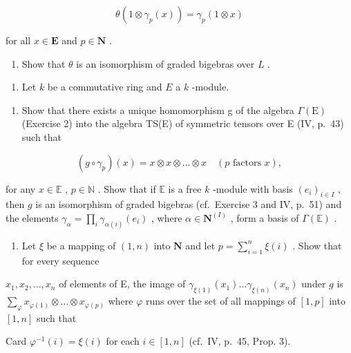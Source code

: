 \[
\theta (1 \otimes \gamma_ {p} (x)) = \gamma_ {p} (1 \otimes x)
\]

for all \(x \in \mathbf{E}\) and \(p \in \mathbf{N}\) .

\begin{enumerate}
\def\labelenumi{\alph{enumi})}
\setcounter{enumi}{1}
\tightlist
\item
  Show that \(\theta\) is an isomorphism of graded bigebras over \(L\) .
\end{enumerate}

\begin{enumerate}
\def\labelenumi{\arabic{enumi})}
\setcounter{enumi}{7}
\tightlist
\item
  Let \(k\) be a commutative ring and \(E\) a \(k\) -module.
\end{enumerate}

\begin{enumerate}
\def\labelenumi{\alph{enumi})}
\tightlist
\item
  Show that there exists a unique homomorphism g of the algebra \(\Gamma(\mathrm{E})\) (Exercise 2) into the algebra TS(E) of symmetric tensors over E (IV, p.~43) such that
\end{enumerate}

\[
(g \circ \gamma_ {p}) (x) = x \otimes x \otimes \dots \otimes x \quad (p \text {   factors   } x),
\]

for any \(x \in \mathbb{E}\) , \(p \in \mathbb{N}\) . Show that if \(\mathbb{E}\) is a free \(k\) -module with basis \((e_i)_{i \in I}\) , then \(g\) is an isomorphism of graded bigebras (cf.~Exercise 3 and IV, p.~51) and the elements \(\gamma_\alpha = \prod_i \gamma_{\alpha(i)}(e_i)\) , where \(\alpha \in \mathbf{N}^{(I)}\) , form a basis of \(\Gamma(\mathbb{E})\) .

\begin{enumerate}
\def\labelenumi{\alph{enumi})}
\setcounter{enumi}{1}
\tightlist
\item
  Let \(\xi\) be a mapping of \((1, n)\) into \(\mathbf{N}\) and let \(p = \sum_{i=1}^{n} \xi(i)\) . Show that for every sequence
\end{enumerate}

\(x_{1}, x_{2}, \ldots, x_{n}\) of elements of E, the image of \(\gamma_{\xi(1)}(x_{1}) \ldots \gamma_{\xi(n)}(x_{n})\) under \(g\) is \(\sum_{\varphi} x_{\varphi(1)} \otimes \ldots \otimes x_{\varphi(p)}\) where \(\varphi\) runs over the set of all mappings of \([1, p]\) into \([1, n]\) such that

Card \(\varphi^{-1}(i) = \xi(i)\) for each \(i \in [1, n]\) (cf.~IV, p.~45, Prop. 3).

